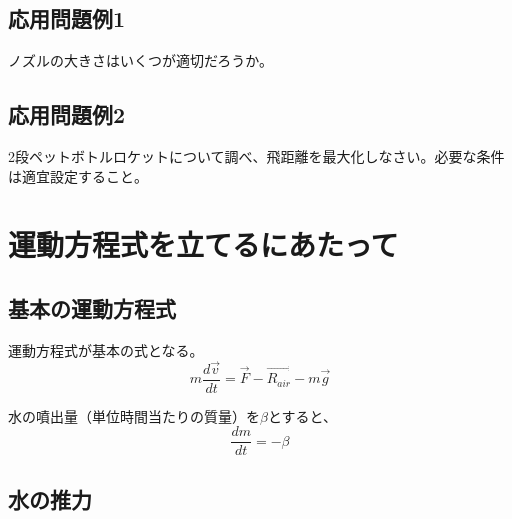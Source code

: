 \documentclass{article}
\begin{document}
\subsection{ 応用問題例1 }

ノズルの大きさはいくつが適切だろうか。

\subsection{ 応用問題例2 }

2段ペットボトルロケットについて調べ、飛距離を最大化しなさい。必要な条件は適宜設定すること。

\section{ 運動方程式を立てるにあたって }

\subsection{ 基本の運動方程式 }
運動方程式が基本の式となる。
\begin{equation}
m \frac{d \vec{v}}{d t} = \vec{F} - \vec{R_{air}} - m \vec{g}
\end{equation}

水の噴出量（単位時間当たりの質量）を$\beta$とすると、
\begin{equation}
\frac{d m}{d t} = -\beta
\end{equation}

\subsection{ 水の推力 }
\end{document}
